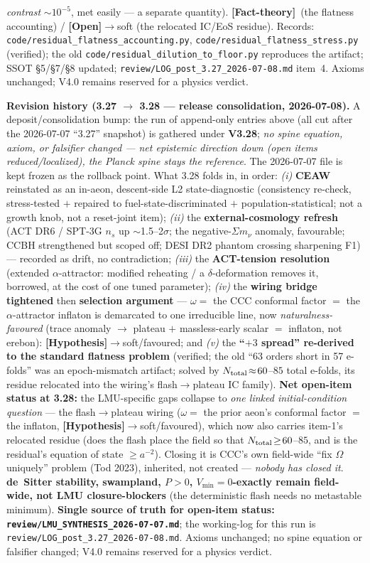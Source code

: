 \documentclass[11pt]{article}
\newcommand{\factth}{\textcolor{green!40!black}{\textbf{[Fact-theory]}}}
\newcommand{\hyp}{\textcolor{orange!80!black}{\textbf{[Hypothesis]}}}
\newcommand{\open}{\textcolor{red!70!black}{\textbf{[Open]}}}
\begin{document}
{\emph{contrast} $\sim\!10^{-5}$, met easily --- a separate quantity). \factth\ (the flatness accounting) / \open$\to$soft (the relocated IC/EoS residue). Records: \texttt{code/residual\_flatness\_accounting.py}, \texttt{code/residual\_flatness\_stress.py} (verified); the old \texttt{code/residual\_dilution\_to\_floor.py} reproduces the artifact; SSOT \S5/\S7/\S8 updated; \texttt{review/LOG\_post\_3.27\_2026-07-08.md} item~4. Axioms unchanged; V4.0 remains reserved for a physics verdict.

\smallskip\noindent\textbf{Revision history (3.27 $\to$ 3.28 --- release consolidation, 2026-07-08).} A deposit/consolidation bump: the run of append-only entries above (all cut after the 2026-07-07 ``3.27'' snapshot) is gathered under \textbf{V3.28}; \emph{no spine equation, axiom, or falsifier changed --- net epistemic direction down (open items reduced/localized), the Planck spine stays the reference}. The 2026-07-07 file is kept frozen as the rollback point. What 3.28 folds in, in order: \emph{(i)} \textbf{CEAW} reinstated as an in-aeon, descent-side L2 state-diagnostic (consistency re-check, stress-tested $+$ repaired to fuel-state-discriminated $+$ population-statistical; not a growth knob, not a reset-joint item); \emph{(ii)} the \textbf{external-cosmology refresh} (ACT DR6 / SPT-3G $n_s$ up $\sim$1.5--2$\sigma$; the negative-$\Sigma m_\nu$ anomaly, favourable; CCBH strengthened but scoped off; DESI DR2 phantom crossing sharpening F1) --- recorded as drift, no contradiction; \emph{(iii)} the \textbf{ACT-tension resolution} (extended $\alpha$-attractor: modified reheating / a $\delta$-deformation removes it, borrowed, at the cost of one tuned parameter); \emph{(iv)} the \textbf{wiring bridge tightened} then \textbf{selection argument} --- $\omega=$ the CCC conformal factor $=$ the $\alpha$-attractor inflaton is demarcated to one irreducible line, now \emph{naturalness-favoured} (trace anomaly $\to$ plateau $+$ massless-early scalar $=$ inflaton, not erebon): \hyp$\to$soft/favoured; and \emph{(v)} the \textbf{``$+3$ spread'' re-derived to the standard flatness problem} (verified; the old ``63 orders short in 57 e-folds'' was an epoch-mismatch artifact; solved by $N_{\rm total}\!\approx\!60$--$85$ total e-folds, its residue relocated into the wiring's flash$\to$plateau IC family). \textbf{Net open-item status at 3.28:} the LMU-specific gaps collapse to \emph{one linked initial-condition question} --- the flash$\to$plateau wiring ($\omega=$ the prior aeon's conformal factor $=$ the inflaton, \hyp$\to$soft/favoured), which now also carries item-1's relocated residue (does the flash place the field so that $N_{\rm total}\!\ge\!60$--$85$, and is the residual's equation of state $\ge a^{-2}$). Closing it is CCC's own field-wide ``fix $\Omega$ uniquely'' problem (Tod 2023), inherited, not created --- \emph{nobody has closed it}. \textbf{de~Sitter stability, swampland, $P>0$, $V_{\min}=0$-exactly remain field-wide, not LMU closure-blockers} (the deterministic flash needs no metastable minimum). \textbf{Single source of truth for open-item status: \texttt{review/LMU\_SYNTHESIS\_2026-07-07.md}}; the working-log for this run is \texttt{review/LOG\_post\_3.27\_2026-07-08.md}. Axioms unchanged; no spine equation or falsifier changed; V4.0 remains reserved for a physics verdict.
}
\end{document}

